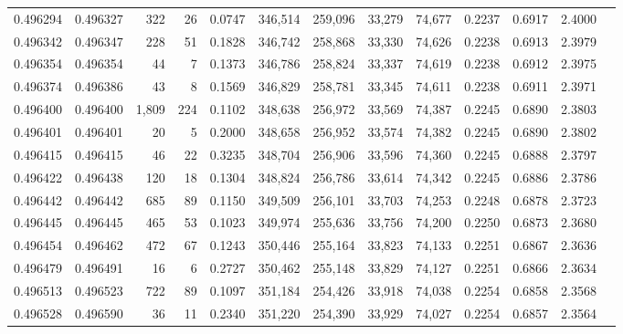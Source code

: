 \begin{tabular}{rrrrrrrrrrrrr}
0.496294 & 0.496327 &   322 &    26 &                                     0.0747 & 346,514 & 259,096 &  33,279 &  74,677 & 0.2237 & 0.6917 & 2.4000 \\
0.496342 & 0.496347 &   228 &    51 &                                     0.1828 & 346,742 & 258,868 &  33,330 &  74,626 & 0.2238 & 0.6913 & 2.3979 \\
0.496354 & 0.496354 &    44 &     7 &                                     0.1373 & 346,786 & 258,824 &  33,337 &  74,619 & 0.2238 & 0.6912 & 2.3975 \\
0.496374 & 0.496386 &    43 &     8 &                                     0.1569 & 346,829 & 258,781 &  33,345 &  74,611 & 0.2238 & 0.6911 & 2.3971 \\
0.496400 & 0.496400 & 1,809 &   224 &                                     0.1102 & 348,638 & 256,972 &  33,569 &  74,387 & 0.2245 & 0.6890 & 2.3803 \\
0.496401 & 0.496401 &    20 &     5 &                                     0.2000 & 348,658 & 256,952 &  33,574 &  74,382 & 0.2245 & 0.6890 & 2.3802 \\
0.496415 & 0.496415 &    46 &    22 &                                     0.3235 & 348,704 & 256,906 &  33,596 &  74,360 & 0.2245 & 0.6888 & 2.3797 \\
0.496422 & 0.496438 &   120 &    18 &                                     0.1304 & 348,824 & 256,786 &  33,614 &  74,342 & 0.2245 & 0.6886 & 2.3786 \\
0.496442 & 0.496442 &   685 &    89 &                                     0.1150 & 349,509 & 256,101 &  33,703 &  74,253 & 0.2248 & 0.6878 & 2.3723 \\
0.496445 & 0.496445 &   465 &    53 &                                     0.1023 & 349,974 & 255,636 &  33,756 &  74,200 & 0.2250 & 0.6873 & 2.3680 \\
0.496454 & 0.496462 &   472 &    67 &                                     0.1243 & 350,446 & 255,164 &  33,823 &  74,133 & 0.2251 & 0.6867 & 2.3636 \\
0.496479 & 0.496491 &    16 &     6 &                                     0.2727 & 350,462 & 255,148 &  33,829 &  74,127 & 0.2251 & 0.6866 & 2.3634 \\
0.496513 & 0.496523 &   722 &    89 &                                     0.1097 & 351,184 & 254,426 &  33,918 &  74,038 & 0.2254 & 0.6858 & 2.3568 \\
0.496528 & 0.496590 &    36 &    11 &                                     0.2340 & 351,220 & 254,390 &  33,929 &  74,027 & 0.2254 & 0.6857 & 2.3564 \\

\end{tabular}
